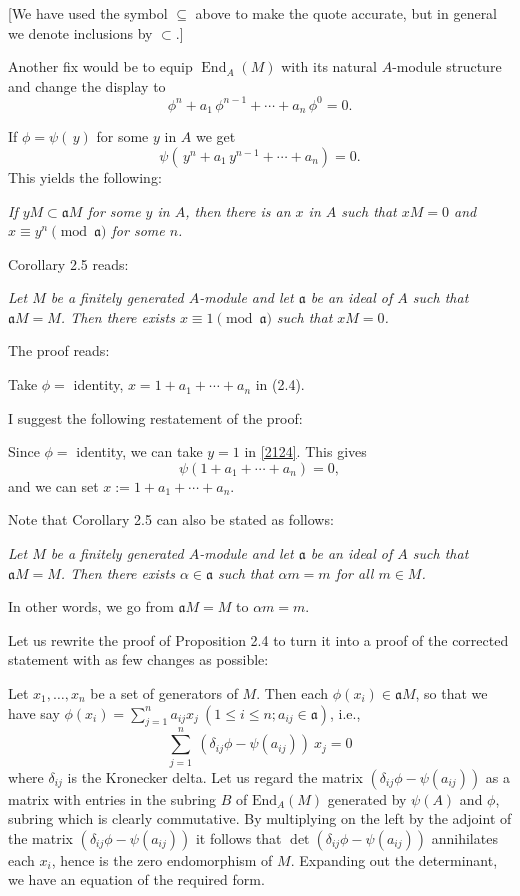 \documentclass[12pt]{article}
\newcommand{\mf}{\mathfrak}
\begin{document}
[We have used the symbol $\subseteq$ above to make the quote accurate, but in general we denote inclusions by $\subset$.]

Another fix would be to equip $\operatorname{End}_A(M)$ with its natural $A$-module structure and change the display to 
$$
\phi^n+a_1\,\phi^{n-1}+\cdots+a_n\,\phi^0=0.
$$

If $\phi=\psi(\,y)$ for some $y$ in $A$ we get 
\begin{equation}\label{2124}
\psi(\,y^n+a_1\,y^{n-1}+\cdots+a_n)=0.
\end{equation}
This yields the following:

\emph{If $yM\subset\mf aM$ for some $y$ in $A$, then there is an $x$ in $A$ such that $xM=0$ and $x\equiv y^n\pmod{\mf a}$ for some $n$.}

Corollary 2.5 reads:

\emph{Let $M$ be a finitely generated $A$-module and let $\mf a$ be an ideal of $A$ such that $\mf aM=M$. Then there exists $x\equiv1\pmod{\mf a}$ such that $xM=0$.}

The proof reads:

Take $\phi=$ identity, $x=1+a_1+\cdots+a_n$ in (2.4).

I suggest the following restatement of the proof:

Since $\phi=$ identity, we can take $y=1$ in \eqref{2124}. This gives 
$$
\psi(1+a_1+\cdots+a_n)=0,
$$ 
and we can set $x:=1+a_1+\cdots+a_n$.

Note that Corollary 2.5 can also be stated as follows:

\emph{Let $M$ be a finitely generated $A$-module and let $\mf a$ be an ideal of $A$ such that $\mf aM=M$. Then there exists $\alpha\in\mf a$ such that $\alpha m=m$ for all $m\in M$.}

In other words, we go from $\mf aM=M$ to $\alpha m=m$.

Let us rewrite the proof of Proposition 2.4 to turn it into a proof of the corrected statement with as few changes as possible:

Let $x_1,\dots,x_n$ be a set of generators of $M$. Then each $\phi(x_i)\in\mf aM$, so that we have say $\phi(x_i)=\sum_{j=1}^na_{ij}x_j\ (1\le i\le n; a_{ij}\in\mf a)$, i.e., 
$$
\sum_{j=1}^n\ (\delta_{ij}\phi-\psi(a_{ij}))\ x_j=0
$$ 
where $\delta_{ij}$ is the Kronecker delta. Let us regard the matrix $(\delta_{ij}\phi-\psi(a_{ij}))$ as a matrix with entries in the subring $B$ of $\text{End}_A(M)$ generated by $\psi(A)$ and $\phi$, subring which is clearly commutative. By multiplying on the left by the adjoint of the matrix $(\delta_{ij}\phi-\psi(a_{ij}))$ it follows that $\det(\delta_{ij}\phi-\psi(a_{ij}))$ annihilates each $x_i$, hence is the zero endomorphism of $M$. Expanding out the determinant, we have an equation of the required form.
\end{document}
